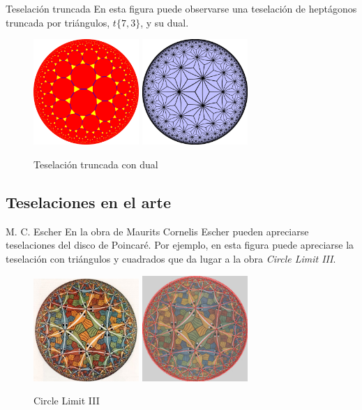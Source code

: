 \documentclass[compress]{beamer}
\begin{document}
\begin{frame}{Teselación truncada}
  En esta figura puede observarse una teselación de heptágonos
  truncada por triángulos, $t\{7,3\}$, y su dual.

  \begin{figure}[ht!]
    \centering
    \includegraphics[width=40mm]{./tiling73t.png}
    \quad
    \includegraphics[width=40mm]{./tiling73tdual.png}
    \caption{Teselación truncada con dual\label{tilingt7}}
  \end{figure}
\end{frame}

\subsection{Teselaciones en el arte}
\begin{frame}{M. C. Escher}
  En la obra de Maurits Cornelis Escher pueden apreciarse teselaciones
  del disco de Poincaré. Por ejemplo, en esta figura puede apreciarse
  la teselación con triángulos y cuadrados que da lugar a la obra
  \textit{Circle Limit III}.

  \begin{figure}[ht!]
    \centering
    \includegraphics[width=40mm]{./limit3.jpg}
    \includegraphics[width=40mm]{./limit3overlay.png}
    \caption{Circle Limit III\label{limit3}}
  \end{figure}
\end{frame}
\end{document}
